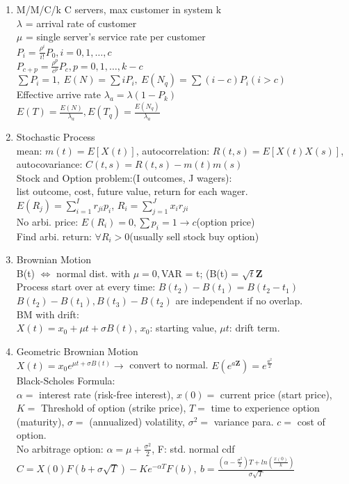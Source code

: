 \documentclass[10pt]{article}
\begin{document}
\begin{multicols}{2}
\begin{enumerate}
	\item M/M/C/k C servers, max customer in system k\\
	$\lambda$ = arrival rate of customer\\
	$\mu$ = single server's service rate per customer\\
	$P_i = \frac{\rho^i}{i!}P_0, i = 0,1,\dots,c$\\
	$P_{c+p} = \frac{\rho^p}{c^p}P_c, p = 0,1,\dots,k - c$\\
	$\sum P_i = 1, \ E(N) = \sum iP_i, \ E(N_q) = \sum (i-c)P_i (i>c)$\\
	Effective arrive rate $\lambda_a = \lambda(1-P_k)$\\
	$E(T) = \frac{E(N)}{\lambda_a}, E(T_q) = \frac{E(N_q)}{\lambda_a}$
	
	\item Stochastic Process\\
	mean: $m(t) = E[X(t)]$, autocorrelation: $R(t,s) = E[X(t)X(s)]$, autocovariance: $C(t,s) = R(t,s) - m(t)m(s)$\\
	Stock and Option problem:(I outcomes, J wagers):\\
	list outcome, cost, future value, return for each wager. \\$E(R_j) = \sum_{i = 1}^{I} r_{ji}p_i$, $R_i = \sum_{j = 1}^{J} x_ir_{ji} $\\
	No arbi. price: $E(R_i) = 0, \sum p_i = 1\rightarrow c$(option price)\\
	Find arbi. return: $\forall R_i > 0$(usually sell stock buy option) 

	\item Brownian Motion\\
	B(t) $\Leftrightarrow$ normal dist. with $\mu = 0, $VAR = t; (B(t) = $\sqrt{t}\mathbf{Z}$\\
	Process start over at every time: $B(t_2) - B(t_1) = B(t_2 - t_1)$\\
	$B(t_2) - B(t_1), B(t_3) - B(t_2)$ are independent if no overlap.\\
	BM with drift:\\
	$X(t) = x_0 + \mu t + \sigma B(t)$, $x_0$: starting value, $\mu t$: drift term.
	
	\item Geometric Brownian Motion\\
	$X(t) = x_0e^{\mu t + \sigma B(t)}\rightarrow$ convert to normal. $E(e^{a\mathbf{Z}}) = e^{\frac{a^2}{2}}$\\
	Black-Scholes Formula:\\
	$\alpha=$ interest rate (risk-free interest), $x(0)=$ current price (start price), $K=$ Threshold of option (strike price), $T=$ time to experience option (maturity), $\sigma=$ (annualized) volatility, $\sigma^2=$ variance para. $c=$ cost of option.\\
	No arbitrage option: $\alpha = \mu + \frac{\sigma^2}{2}$, F: std. normal cdf\\
	$C = X(0)F(b+\sigma \sqrt{T}) - Ke^{-\alpha T}F(b), \ b = \frac{(\alpha - \frac{\sigma^2}{2})T + ln(\frac{x(0)}{k})}{\sigma \sqrt{T}}$
\end{enumerate}

\newpage

\end{multicols}      
\end{document}
